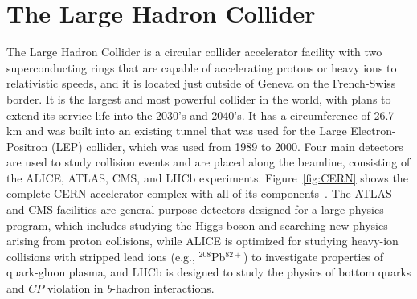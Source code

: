 \section{The Large Hadron Collider}
\label{sec:LHC}

The Large Hadron Collider is a circular collider accelerator facility with two superconducting rings that are capable of accelerating protons or heavy ions to relativistic speeds, and it is located just outside of Geneva on the French-Swiss border.
It is the largest and most powerful collider in the world, with plans to extend its service life into the 2030's and 2040's.
It has a circumference of 26.7 km and was built into an existing tunnel that was used for the Large Electron-Positron (LEP) collider, which was used from 1989 to 2000.
Four main detectors are used to study collision events and are placed along the beamline, consisting of the ALICE, ATLAS, CMS, and LHCb experiments.
Figure~\ref{fig:CERN} shows the complete CERN accelerator complex with all of its components~\cite{Mobs:2636343}.
The ATLAS and CMS facilities are general-purpose detectors designed for a large physics program, which includes studying the Higgs boson and searching new physics arising from proton collisions, while ALICE is optimized for studying heavy-ion collisions with stripped lead ions (e.g., $^{208}$Pb$^{82+}$) to investigate properties of quark-gluon plasma, and LHCb is designed to study the physics of bottom quarks and $CP$ violation in $b$-hadron interactions.

